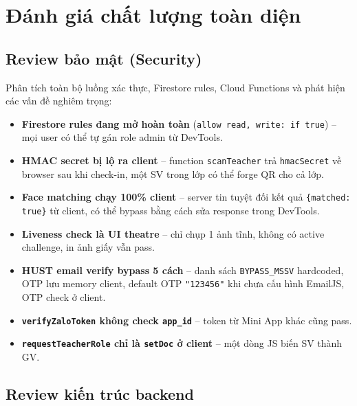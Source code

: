 \documentclass{article}
\begin{document}
\section{Đánh giá chất lượng toàn diện}

\subsection{Review bảo mật (Security)}

Phân tích toàn bộ luồng xác thực, Firestore rules, Cloud Functions và phát hiện các vấn đề nghiêm trọng:

\begin{itemize}[leftmargin=1.5em]
  \item \textbf{Firestore rules đang mở hoàn toàn} (\texttt{allow read, write: if true}) -- mọi user có thể tự gán role admin từ DevTools.
  \item \textbf{HMAC secret bị lộ ra client} -- function \texttt{scanTeacher} trả \texttt{hmacSecret} về browser sau khi check-in, một SV trong lớp có thể forge QR cho cả lớp.
  \item \textbf{Face matching chạy 100\% client} -- server tin tuyệt đối kết quả \texttt{\{matched: true\}} từ client, có thể bypass bằng cách sửa response trong DevTools.
  \item \textbf{Liveness check là UI theatre} -- chỉ chụp 1 ảnh tĩnh, không có active challenge, in ảnh giấy vẫn pass.
  \item \textbf{HUST email verify bypass 5 cách} -- danh sách \texttt{BYPASS\_MSSV} hardcoded, OTP lưu memory client, default OTP \texttt{"123456"} khi chưa cấu hình EmailJS, OTP check ở client.
  \item \textbf{\texttt{verifyZaloToken} không check \texttt{app\_id}} -- token từ Mini App khác cũng pass.
  \item \textbf{\texttt{requestTeacherRole} chỉ là \texttt{setDoc} ở client} -- một dòng JS biến SV thành GV.
\end{itemize}

\subsection{Review kiến trúc backend}
\end{document}

